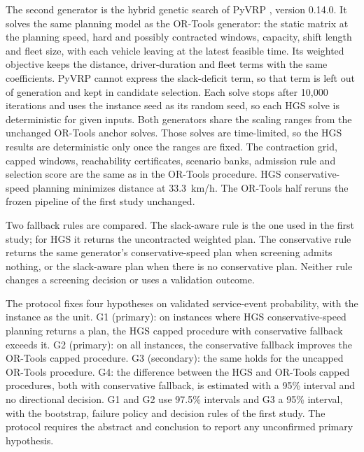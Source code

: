 \documentclass[11pt,a4paper]{article}
\begin{document}
The second generator is the hybrid genetic search of PyVRP
\cite{vidal2022,wouda2024}, version 0.14.0. It solves the same planning model as
the OR-Tools generator: the static matrix at the planning speed, hard and possibly
contracted windows, capacity, shift length and fleet size, with each vehicle
leaving at the latest feasible time. Its weighted objective keeps the distance,
driver-duration and fleet terms with the same coefficients. PyVRP cannot express
the slack-deficit term, so that term is left out of generation and kept in
candidate selection. Each solve stops after 10,000 iterations and uses the
instance seed as its random seed, so each HGS solve is deterministic for given
inputs. Both generators share the scaling ranges from the unchanged OR-Tools
anchor solves. Those solves are time-limited, so the HGS results are deterministic
only once the ranges are fixed. The contraction grid, capped
windows, reachability certificates, scenario banks, admission rule and selection
score are the same as in the OR-Tools procedure. HGS conservative-speed planning
minimizes distance at 33.3~km/h. The OR-Tools half reruns the frozen pipeline of
the first study unchanged.

Two fallback rules are compared. The slack-aware rule is the one used in the
first study; for HGS it returns the uncontracted weighted plan. The conservative
rule returns the same generator's conservative-speed plan when screening admits
nothing, or the slack-aware plan when there is no conservative plan. Neither rule
changes a screening decision or uses a validation outcome.

The protocol fixes four hypotheses on validated service-event probability, with
the instance as the unit. G1 (primary): on instances where HGS conservative-speed
planning returns a plan, the HGS capped procedure with conservative fallback
exceeds it. G2 (primary): on all instances, the conservative fallback improves
the OR-Tools capped procedure. G3 (secondary): the same holds for the uncapped
OR-Tools procedure. G4: the difference between the HGS and OR-Tools capped
procedures, both with conservative fallback, is estimated with a 95\% interval
and no directional decision. G1 and G2 use 97.5\% intervals and G3 a 95\%
interval, with the bootstrap, failure policy and decision rules of the first
study. The protocol requires the abstract and conclusion to report any
unconfirmed primary hypothesis.
\end{document}
